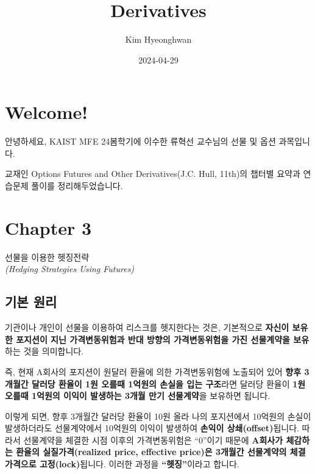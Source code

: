 \documentclass[
  letterpaper,
  DIV=11,
  numbers=noendperiod]{scrreprt}
\title{Derivatives}
\author{Kim Hyeonghwan}
\date{2024-04-29}
\renewcommand*\contentsname{Table of contents}
\newcommand\contentsname{Table of contents}
\begin{document}
\maketitle

\renewcommand*\contentsname{Table of contents}
{
\hypersetup{linkcolor=}
\setcounter{tocdepth}{2}
\tableofcontents
}

\chapter*{Welcome!}\label{welcome}


안녕하세요, KAIST MFE 24봄학기에 이수한 류혁선 교수님의 선물 및 옵션
과목입니다.

교재인 Options Futures and Other Derivatives(J.C. Hull, 11th)의 챕터별
요약과 연습문제 풀이를 정리해두었습니다.


\chapter*{Chapter 3}\label{chapter-3}


선물을 이용한 헷징전략\\
\emph{(Hedging Strategies Using Futures)}

\section*{기본 원리}\label{uxae30uxbcf8-uxc6d0uxb9ac}


기관이나 개인이 선물을 이용하여 리스크를 헷지한다는 것은, 기본적으로
\textbf{자신이 보유한 포지션이 지닌 가격변동위험과 반대 방향의
가격변동위험을 가진 선물계약을 보유}하는 것을 의미합니다.

즉, 현재 A회사의 포지션이 원달러 환율에 의한 가격변동위험에 노출되어
있어 \textbf{향후 3개월간 달러당 환율이 1원 오를때 1억원의 손실을 입는
구조}라면 달러당 환율이 \textbf{1원 오를때 1억원의 이익이 발생하는 3개월
만기 선물계약}을 보유하면 됩니다.

이렇게 되면, 향후 3개월간 달러당 환율이 10원 올라 나의 포지션에서
10억원의 손실이 발생하더라도 선물계약에서 10억원의 이익이 발생하여
\textbf{손익이 상쇄(offset)}됩니다. 따라서 선물계약을 체결한 시점 이후의
가격변동위험은 ``0''이기 때문에 \textbf{A회사가 체감하는 환율의
실질가격(realized price, effective price)은 3개월간 선물계약의
체결가격으로 고정(lock)}됩니다. 이러한 과정을 \textbf{``헷징''}이라고
합니다.
\end{document}
